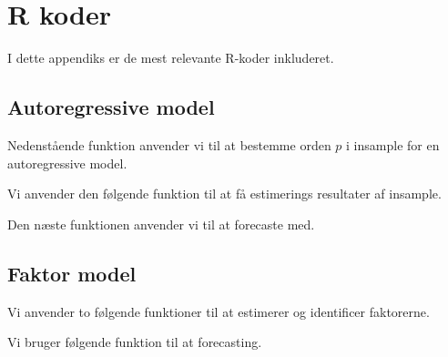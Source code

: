 \chapter{R koder} \label{app:r_koder}
I dette appendiks er de mest relevante R-koder inkluderet. 

\section{Autoregressive model} \label{sec:auto}
Nedenstående funktion anvender vi til at bestemme orden $p$ i insample for en autoregressive model.  

Vi anvender den følgende funktion til at få estimerings resultater af insample. 

Den næste funktionen anvender vi til at forecaste med. 

\section{Faktor model} \label{sec:faktor}
Vi anvender to følgende funktioner til at estimerer og identificer faktorerne. 


Vi bruger følgende funktion til at forecasting.
